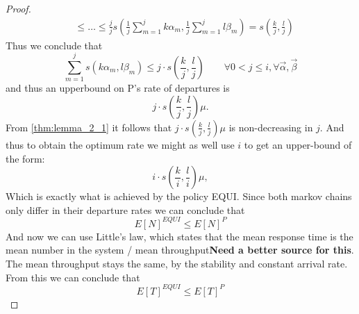 \begin{proof}
\begin{align*}
    &\leq \dots \leq \frac{j}{j} s(\frac{1}{j}\sum_{m=1}^jk\alpha_m, \frac{1}{j}\sum_{m=1}^j l\beta_m) = s(\frac{k}{j}, \frac{l}{j})
\end{align*}
Thus we conclude that $$\sum_{m=1}^j s(k\alpha_m, l\beta_m) \leq j\cdot s(\frac{k}{j}, \frac{l}{j}) \qquad \forall 0 < j \leq i, \forall \vec{\alpha},\vec{\beta}$$
and thus an upperbound on P's rate of departures is $$j \cdot s \left(\frac{k}{j},\frac{l}{j}\right) \mu.$$ From \autoref{thm:lemma_2_1} it follows that $j\cdot s\left(\frac{k}{j},\frac{l}{j}\right)\mu$ is non-decreasing in $j$. And thus to obtain the optimum rate we might as well use $i$ to get an upper-bound of the form:
$$i\cdot s\left(\frac{k}{i},\frac{l}{i}\right)\mu,$$
Which is exactly what is achieved by the policy EQUI. Since both markov chains only differ in their departure rates we can conclude that
$$E[N]^{EQUI} \leq E[N]^P$$
And now we can use Little's law, which states that the mean response time is the mean number in the system / mean throughput\cite{Littles_law}\textbf{Need a better source for this}. The mean throughput stays the same, by the stability and constant arrival rate. From this we can conclude that
$$E[T]^{EQUI} \leq E[T]^P$$
\end{proof}

